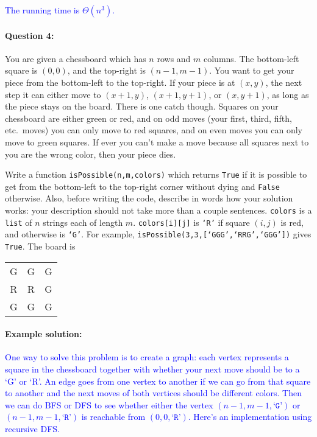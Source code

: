 \documentclass[11pt]{article}
\newcommand{\sol}[1]{\textcolor{blue}{#1}}
\begin{document}
\noindent \sol{The running time is $\Theta(n^3)$.}


\newpage

\paragraph{Question 4:}
You are given a chessboard which has $n$ rows and $m$ columns.  The
bottom-left square is $(0,0)$, and the top-right is $(n-1,m-1)$.  
You want to get your piece from the bottom-left to
the top-right.  If your piece is at $(x,y)$, the next step it can
either move to $(x+1,y)$, $(x+1,y+1)$, or $(x,y+1)$, as long as the
piece stays on the board.
There is one catch though.  Squares on your chessboard
are either green or red, and on odd moves (your first, third, fifth,
etc.\ moves) you can only move to red
squares, and on even moves you can only move to green squares.  If
ever you can't make a move because all squares
next to you are the wrong color, then your piece dies.

Write a function \texttt{isPossible(n,m,colors)} which returns
\texttt{True} if it is possible to get from the
bottom-left to the top-right corner without dying and \texttt{False}
otherwise.
Also, before writing the code, describe in words how your solution
works: your description should not take more than  a couple sentences.
\texttt{colors} is a
\texttt{list} of $n$ strings each of length $m$.
\texttt{colors[i][j]} is \texttt{`R'} if square $(i,j)$ is red, and
otherwise is \texttt{`G'}.  For example,
\texttt{isPossible(3,3,[`GGG',`RRG',`GGG'])} gives \texttt{True}. The
board is
\begin{center}
\begin{tabular}{ccc}
G&G&G\\
R&R&G\\
G&G&G
\end{tabular}
\end{center}

\paragraph{Example solution:}

\sol{One way to solve this problem is to create a graph: each vertex
  represents a square in the chessboard together with whether your
  next move should be to a `G' or `R'. An edge goes from one vertex to
another if we can go from that square to another and the next moves of
both vertices should be different colors.  Then we can do BFS or DFS
to see whether either the vertex $(n-1,m-1,\texttt{`G'})$ or
$(n-1,m-1,\texttt{`R'})$ is reachable from $(0,0,\texttt{`R'})$.
Here's an implementation using
recursive DFS.}
\end{document}
